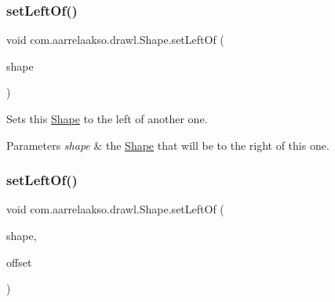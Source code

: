 \subsubsection{\texorpdfstring{set\+Left\+Of()}{setLeftOf()}\hspace{0.1cm}{\footnotesize\ttfamily [1/2]}}
{\footnotesize\ttfamily void com.\+aarrelaakso.\+drawl.\+Shape.\+set\+Left\+Of (\begin{DoxyParamCaption}\item[{@Not\+Null final \hyperlink{classcom_1_1aarrelaakso_1_1drawl_1_1_shape}{Shape}}]{shape }\end{DoxyParamCaption})\hspace{0.3cm}{\ttfamily [inherited]}}



Sets this \hyperlink{classcom_1_1aarrelaakso_1_1drawl_1_1_shape}{Shape} to the left of another one. 


\begin{DoxyParams}{Parameters}
{\em shape} & the \hyperlink{classcom_1_1aarrelaakso_1_1drawl_1_1_shape}{Shape} that will be to the right of this one. \\
\hline
\end{DoxyParams}
\mbox{\label{classcom_1_1aarrelaakso_1_1drawl_1_1_shape_a8012a3823982d77b563ef61787ccb523}} 
\subsubsection{\texorpdfstring{set\+Left\+Of()}{setLeftOf()}\hspace{0.1cm}{\footnotesize\ttfamily [2/2]}}
{\footnotesize\ttfamily void com.\+aarrelaakso.\+drawl.\+Shape.\+set\+Left\+Of (\begin{DoxyParamCaption}\item[{@Not\+Null final \hyperlink{classcom_1_1aarrelaakso_1_1drawl_1_1_shape}{Shape}}]{shape,  }\item[{@Not\+Null final \hyperlink{classcom_1_1aarrelaakso_1_1drawl_1_1_measure}{Measure}}]{offset }\end{DoxyParamCaption})\hspace{0.3cm}{\ttfamily [inherited]}}



